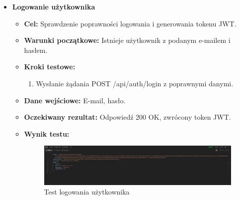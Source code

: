 \begin{itemize}
    \item \textbf{Logowanie użytkownika}
    \begin{itemize}
        \item \textbf{Cel:} Sprawdzenie poprawności logowania i generowania tokenu JWT.
        \item \textbf{Warunki początkowe:} Istnieje użytkownik z podanym e-mailem i hasłem.
        \item \textbf{Kroki testowe:}
        \begin{enumerate}
            \item Wysłanie żądania POST /api/auth/login z poprawnymi danymi.
        \end{enumerate}
        \item \textbf{Dane wejściowe:} E-mail, hasło.
        \item \textbf{Oczekiwany rezultat:} Odpowiedź 200 OK, zwrócony token JWT.
        \item \textbf{Wynik testu:}
        \begin{figure}[H]
            \includegraphics[width=480px]{figures/testy/test-login.png}
            \caption{Test logowania użytkownika}
        \end{figure}
    \end{itemize}


\end{itemize}

